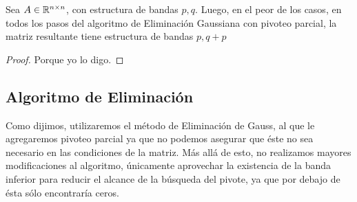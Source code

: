 \begin{lema}
Sea $A \in \mathbb{R}^{n \times n}$, con estructura de bandas $p, q$. Luego, en el peor de los casos, en todos los pasos del algoritmo de Eliminación Gaussiana con pivoteo parcial, la matriz resultante tiene estructura de bandas $p, q+p$
\end{lema}
\begin{proof}
Porque yo lo digo.
\end{proof}

\subsection{Algoritmo de Eliminación}
Como dijimos, utilizaremos el método de Eliminación de Gauss, al que le agregaremos pivoteo parcial  ya que no podemos asegurar que éste no sea necesario en las condiciones de la matriz. Más allá de esto, no realizamos mayores modificaciones al algoritmo, únicamente aprovechar la existencia de la banda inferior para reducir el alcance de la búsqueda del pivote, ya que por debajo de ésta sólo encontraría ceros.




